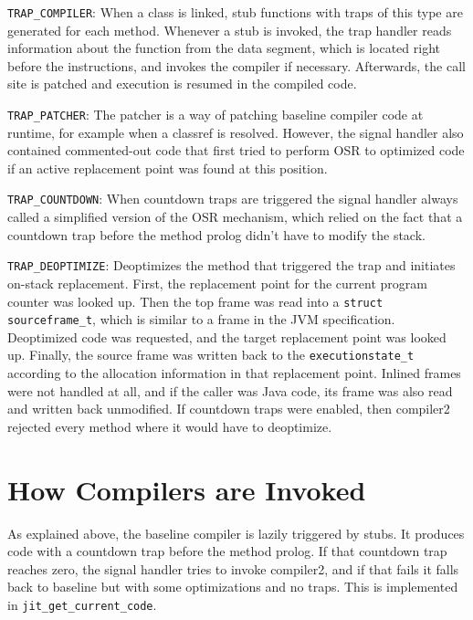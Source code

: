 \documentclass[draft,final]{vutinfth} %
\begin{document}
    \lstinline{TRAP_COMPILER}:
    When a class is linked, stub functions with traps of this type are generated for each method.
    Whenever a stub is invoked, the trap handler reads information about the function from the
    data segment, which is located right before the instructions, and invokes the compiler if necessary.
    Afterwards, the call site is patched and execution is resumed in the compiled code.

    \lstinline{TRAP_PATCHER}:
    The patcher is a way of patching baseline compiler code at runtime, for example when a classref is resolved.
    However, the signal handler also contained commented-out code that first tried to perform OSR to optimized code if an active replacement point was found at this position.

    \lstinline{TRAP_COUNTDOWN}:
    When countdown traps are triggered
    the signal handler always called a simplified version of the OSR mechanism,
    which relied on the fact that a countdown trap before the method prolog didn't have to modify the stack.

    \lstinline{TRAP_DEOPTIMIZE}:
    Deoptimizes the method that triggered the trap and initiates on-stack replacement.
    First, the replacement point for the current program counter was looked up.
    Then the top frame was read into a \lstinline{struct sourceframe_t}, which is similar to a frame in the JVM specification.
    Deoptimized code was requested, and the target replacement point was looked up.
    Finally, the source frame was written back to the \lstinline{executionstate_t} according to the allocation information in that replacement point.
    Inlined frames were not handled at all,
    and if the caller was Java code,
    its frame was also read and written back unmodified.
    If countdown traps were enabled, then compiler2 rejected every method where it would have to deoptimize.


    \section{How Compilers are Invoked}

    As explained above, the baseline compiler is lazily triggered by stubs.
    It produces code with a countdown trap before the method prolog.
    If that countdown trap reaches zero, the signal handler
    tries to invoke compiler2, and if that fails it
    falls back to baseline but with some optimizations and no traps.
    This is implemented in \lstinline{jit_get_current_code}.
\end{document}
